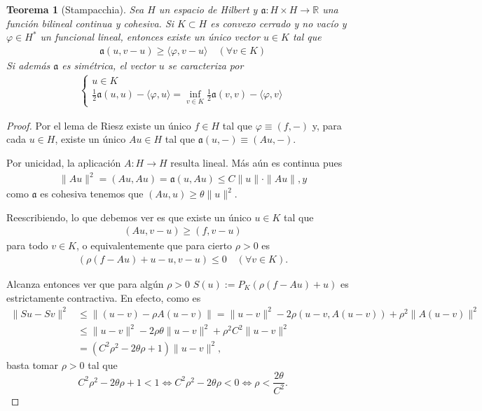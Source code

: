 \documentclass[11pt]{report}
\theoremstyle{colored}
\newtheorem{theorem}{Teorema}[section]
\newcommand{\R}{\mathbb{R}}
\newcommand{\ip}[1]{( #1 )}
\begin{document}
\begin{theorem}[Stampacchia] Sea $H$ un espacio de Hilbert y $\mathfrak{a} : H \times H \to \R$ una función bilineal continua y cohesiva. Si $K \subset H$ es convexo cerrado y no vacío y $\varphi \in H^*$ un funcional lineal, entonces existe un único vector $u \in K$ tal que
\begin{align*}
\mathfrak{a}(u,v-u) \geq \langle \varphi, v-u \rangle \quad (\forall v \in K)
\end{align*}
Si además $\mathfrak{a}$ es simétrica, el vector $u$ se caracteriza por
\begin{align*}
\begin{cases}
u \in K\\
\frac{1}{2}\mathfrak{a}(u,u) - \langle \varphi, u \rangle = \inf_{v \in K}\frac{1}{2}\mathfrak{a}(v,v) - \langle \varphi, v \rangle
\end{cases}
\end{align*}
\end{theorem}
\begin{proof} Por el lema de Riesz existe un único $f \in H$ tal que $\varphi \equiv \ip{f,-}$ y, para cada $u \in H$, existe un único $Au \in H$ tal que $\mathfrak{a}(u,-) \equiv \ip{Au,-}$. 

Por unicidad, la aplicación $A : H \to H$ resulta lineal. Más aún es continua pues
\begin{align*}
\|Au\|^2 = \ip{Au,Au} = \mathfrak{a}(u,Au) \leq C \|u\| \cdot \|Au\|, y
\end{align*}
como $\mathfrak{a}$ es cohesiva tenemos que $\ip{Au,u} \geq \theta \|u\|^2$.

Reescribiendo, lo que debemos ver es que existe un único $u \in K$ tal que
\begin{align*}
(Au, v-u) \geq (f,v-u)
\end{align*}
para todo $v \in K$, o equivalentemente que para cierto $\rho > 0$ es
\begin{align*}
\ip{\rho(f-Au) + u -u, v-u} \leq 0 \quad (\forall v \in K).
\end{align*}

Alcanza entonces ver que para algún $\rho > 0$ $S(u) := P_K(\rho(f-Au)+u)$ es estrictamente contractiva. En efecto, como es
\begin{align*}
\|Su-Sv\|^2 &\leq \|(u-v) - \rho A(u-v)\| = \|u-v\|^2 -2\rho(u-v,A(u-v)) + \rho^2\|A(u-v)\|^2\\
&\leq \|u-v\|^2 - 2\rho \theta \|u-v\|^2 + \rho^2C^2\|u-v\|^2\\
&= (C^2\rho^2-2\theta\rho+1)\|u-v\|^2,
\end{align*}
basta tomar $\rho > 0$ tal que 
\[
C^2\rho^2-2\theta\rho+1 < 1 \iff C^2\rho^2-2\theta\rho < 0 \iff \rho < \frac{2\theta}{C^2}.
\]
\end{proof}
\end{document}
